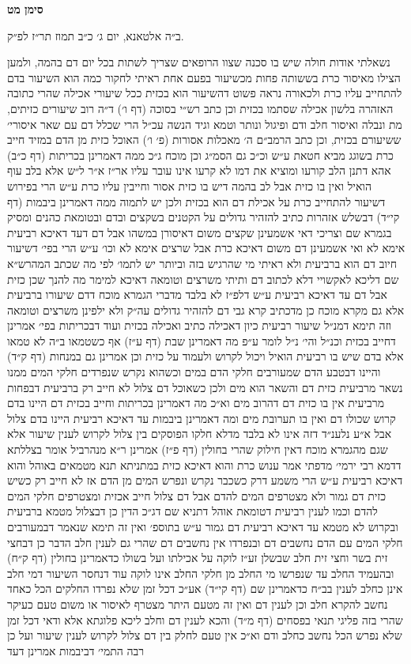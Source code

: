 \documentclass[12pt, openany]{book}
\newcommand{\chapname}{}
\newcommand{\newchap}[1]{
	\addcontentsline{toc}{chapter}{#1}
	\renewcommand{\chapname}{#1}
		\begin{center}
			\textbf{%
\fontsize{16pt}{16pt}\selectfont
				#1}
		\end{center}
}
\begin{document}
\newchap{סימן מט}
\begin{multicols}{2}
ב״ה אלטאנא, יום ג׳ כ״ב תמוז תר״ז לפ״ק.\\\vspace{0pt}

נשאלתי אודות חולה שיש בו סכנה שצוו הרופאים שצריך לשתות בכל יום דם בהמה, ולמען הצילו מאיסור כרת בששותה פחות מכשיעור בפעם אחת ראיתי לחקור כמה הוא השיעור בדם להתחייב עליו כרת ולכאורה נראה פשוט דהשיעור הוא בכזית ככל שיעורי אכילה שהרי כתובה האזהרה בלשון אכילה שסתמו בכזית וכן כתב רש״י בסוכה (דף ו׳) ד״ה רוב שיעורים כזיתים, מת ונבלה ואיסור חלב ודם ופיגול ונותר וטמא וגיד הנשה עכ״ל הרי שכלל דם עם שאר איסורי׳ ששיעורם בכזית, וכן כתב הרמב״ם ה׳ מאכלות אסורות (פ׳ ו׳) האוכל כזית מן הדם במזיד חייב כרת בשוגג מביא חטאת ע״ש וכ״כ גם הסמ״ג וכן מוכח ג״כ ממה דאמרינן בכריתות (דף כ״ב) אהא דתנן הלב קורעו ומוציא את דמו לא קרעו אינו עובר עליו אר״ז א״ר ל״ש אלא בלב עוף הואיל ואין בו כזית אבל לב בהמה דיש בו כזית אסור וחייבין עליו כרת ע״ש הרי בפירוש דשיעור להתחייב כרת על אכילת דם הוא בכזית ולכן יש לתמוה ממה דאמרינן ביבמות (דף קי״ד) דבשלש אזהרות כתיב להזהיר גדולים על הקטנים בשקצים ובדם ובטומאת כהנים ומסיק בגמרא שם וצריכי דאי אשמעינן שקצים משום דאיסורן במשהו אבל דם דעד דאיכא רביעית אימא לא ואי אשמעינן דם משום דאיכא כרת אבל שרצים אימא לא וכו׳ ע״ש הרי בפי׳ דשיעור חיוב דם הוא ברביעית ולא ראיתי מי שהרגיש בזה וביותר יש לתמו׳ לפי מה שכתב המהרש״א שם דליכא לאקשויי דלא לכתוב דם ותיתי משרצים וטומאה דאיכא למימר מה להנך שכן כזית אבל דם עד דאיכא רביעית ע״ש דלפ״ז לא בלבד מדברי הגמרא מוכח דדם שיעורו ברביעית אלא גם מקרא מוכח כן מדכתיב קרא גבי דם להזהיר גדולים עה״ק ולא ילפינן משרצים וטומאה וזה תימא דמנ״ל שיעור רביעית כיון דאכילה כתיב ואכילה בכזית ועוד דבכריתות בפי׳ אמרינן דחייב בכזית וכנ״ל והי׳ נ״ל לומר ע״פ מה דאמרינן שבת (דף ע״ז) אף כשטמאו ב״ה לא טמאו אלא בדם שיש בו רביעית הואיל ויכול לקרוש ולעמוד על כזית וכן אמרינן גם במנחות (דף ק״ד) והיינו דבטבע הדם שמעורבים חלקי הדם במים וכשהוא נקרש שנפרדים חלקי המים ממנו נשאר מרביעית כזית דם והשאר הוא מים ולכן כשאוכל דם צלול לא חייב רק ברביעית דבפחות מרביעית אין בו כזית דם דהרוב מים וא״כ מה דאמרינן בכריתות וחייב בכזית דם היינו בדם קרוש שכולו דם ואין בו תערובת מים ומה דאמרינן ביבמות עד דאיכא רביעית היינו בדם צלול אבל א״ע נלענ״ד דזה אינו לא בלבד מדלא חלקו הפוסקים בין צלול לקרוש לענין שיעור אלא שגם מהגמרא מוכח דאין חילוק שהרי בחולין (דף פ״ז) אמרינן ר״א מנהרביל אומר בצללתא דדמא רבי ירמי׳ מדפתי אמר ענוש כרת והוא דאיכא כזית במתניתא תנא מטמאים באוהל והוא דאיכא רביעית ע״ש הרי משמע דרק כשכבר נקרש ונפרש המים מן הדם אז לא חייב רק כשיש כזית דם גמור ולא מצטרפים המים להדם אבל דם צלול חייב אכזית ומצטרפים חלקי המים להדם וכמו לענין רביעית דטומאת אוהל דתניא שם דג״כ הדין כן דבצלול מטמא ברביעית ובקרוש לא מטמא עד דאיכא רביעית דם גמור ע״ש בתוספ׳ ואין זה תימא שנאמר דבמעורבים חלקי המים עם הדם נחשבים דם ובנפרדו אין נחשבים דם שהרי גם לענין חלב הדבר כן דבחצי זית בשר וחצי זית חלב שבשלן זע״ז לוקה על אכילתו ועל בשולו כדאמרינן בחולין (דף ק״ח) ובהעמיד החלב עד שנפרשו מי החלב מן חלקי החלב אינו לוקה עוד דנחסר השיעור דמי חלב אינן כחלב לענין בב״ח כדאמרינן שם (דף קי״ד) אע״כ דכל זמן שלא נפרדו החלקים הכל כאחד נחשב להקרא חלב וכן לענין דם ואין זה מטעם היתר מצטרף לאיסור או משום טעם כעיקר שהרי בזה פליגי תנאי בפסחים (דף מ״ד) והכא לענין דם וחלב ליכא פלוגתא אלא ודאי דכל זמן שלא נפרש הכל נחשב כחלב ודם וא״כ אין טעם לחלק בין דם צלול לקרוש לענין שיעור ועל כן רבה התמי׳ דביבמות אמרינן דעד 
\end{multicols}
\end{document}
